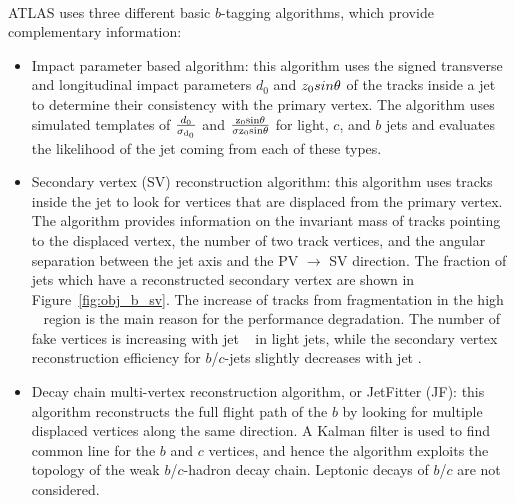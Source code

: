 \paragraph{}
ATLAS uses three different basic $b$-tagging algorithms, which provide complementary information:
\begin{itemize}
	\item Impact parameter based algorithm: this algorithm uses the signed transverse and longitudinal impact parameters $d_0$ and $z_0 sin\rm \theta$ of the tracks inside a jet to determine their consistency with the primary vertex. The algorithm uses simulated templates of $\frac{d_0}{\rm\sigma_{d_0}}$ and $\frac{\rm z_0 sin \theta}{\rm \sigma{\rm z_0 sin\theta}}$ for light, $c$, and $b$ jets and evaluates the likelihood of the jet coming from each of these types.

	\item Secondary vertex (SV) reconstruction algorithm: this algorithm uses tracks inside the jet to look for vertices that are displaced from the primary vertex. The algorithm provides information on the invariant mass of tracks pointing to the displaced vertex, the number of two track vertices, and the angular separation between the jet axis and the PV $\to$ SV direction. The fraction of jets which have a reconstructed secondary vertex are shown in Figure~\ref{fig:obj_b_sv}. The increase of tracks from fragmentation in the high \pt~ region is the main reason for the performance degradation. The number of fake vertices is increasing with jet \pt~ in light jets, while the secondary vertex reconstruction efficiency for $b$/$c$-jets slightly decreases with jet \pt.

	\item Decay chain multi-vertex reconstruction algorithm, or JetFitter (JF): this algorithm reconstructs the full flight path of the $b$ by looking for multiple displaced vertices along the same direction. A Kalman filter is used to find common line for the $b$ and $c$ vertices, and hence the algorithm exploits the topology of the weak $b$/$c$-hadron decay chain. Leptonic decays of $b$/$c$ are not considered.
\end{itemize}
 
